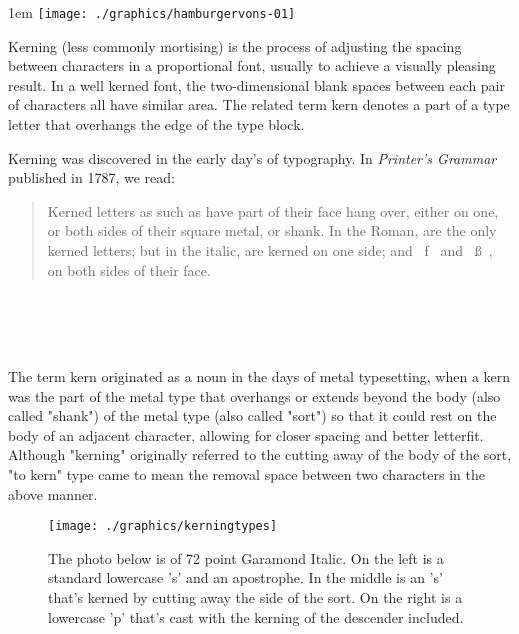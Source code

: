 \clearpage


\begin{multicols}{2}
\parindent1em
\texttt{[image: ./graphics/hamburgervons-01]}
\bigskip

Kerning (less commonly mortising) is the process of adjusting the spacing between characters in a proportional font, usually to achieve a visually pleasing result. In a well kerned font, the two-dimensional blank spaces between each pair of characters all have similar area. The related term kern denotes a part of a type letter that overhangs the edge of the type block.

Kerning was discovered in the early day's of typography. In \textit{Printer's Grammar} published in 1787, we read:

\begin{quotation}
\normalsize
Kerned letters as such as have part of their face hang over, either on one, or both sides of their square metal, or shank. In the Roman,  are the only kerned letters; but in the italic,  are kerned on one side; and {~f~} and {~\ss~}, on both sides of their face.
\end{quotation}

\begin{figure}[htbp]
\noindent{}\\[6pt]  
\scalebox{5}{AVAV}\\[6pt]
\\[6pt]
\caption{}
\end{figure}

The term kern originated as a noun in the days of metal typesetting, when a kern was the part of the metal type that overhangs or extends beyond the body (also called "shank") of the metal type (also called "sort") so that it could rest on the body of an adjacent character, allowing for closer spacing and better letterfit. Although "kerning" originally referred to the cutting away of the body of the sort, "to kern" type came to mean the removal space between two characters in the above manner.

\long{}

\begin{figure}[htbp]
\centering
\texttt{[image: ./graphics/kerningtypes]}
\caption{The photo below is of 72 point Garamond Italic. On the left is a standard lowercase 's' and an apostrophe. In the middle is an 's' that's kerned by cutting away the side of the sort. On the right is a lowercase 'p' that's cast with the kerning of the descender included.}
\end{figure}


\end{multicols}
